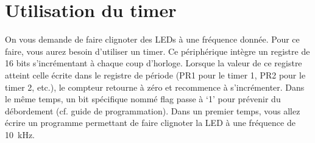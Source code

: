 \documentclass[11pt,a4paper]{article}
\theoremstyle{definition}%
\newcommand{\reponse}[1]{%
	\ifthenelse {\boolean{corrige}} {\paragraph{Réponse :} \color{darkblue}   #1\color{black}} {}
 }
\begin{document}




\section{Utilisation du timer}
On vous demande de faire clignoter des LEDs à une fréquence donnée.
Pour ce faire, vous aurez besoin d’utiliser un timer.
Ce périphérique intègre un registre de 16 bits s’incrémentant à chaque coup d’horloge.
Lorsque la valeur de ce registre atteint celle écrite dans le registre de période (PR1 pour le timer 1, PR2 pour le timer 2, etc.), le compteur retourne à zéro et recommence à s’incrémenter.
Dans le même temps, un bit spécifique nommé flag passe à ‘1’ pour prévenir du débordement (cf. guide de programmation).
Dans un premier temps, vous allez écrire un programme permettant de faire clignoter la LED à une fréquence de 10~kHz.
\end{document}

